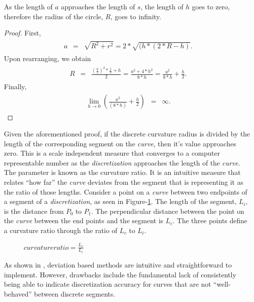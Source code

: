 \begin{theorem}
As the length of $a$ approaches the length of $s$, the length of $h$ goes 
to zero, therefore the radius of the circle, $R$, goes to infinity.  
\end{theorem}

\begin{proof}
First, 
\begin{eqnarray}
\begin{array}{lcl}
a & = & \sqrt{R^2+r^2}=2*\sqrt{(h*(2*R-h)}.
\end{array}
\end{eqnarray}
Upon rearranging, we obtain
\begin{eqnarray}
\begin{array}{lcl}
R & = & \frac{(\frac{a}{2})^2*\frac{1}{h}+h}{2}=
\frac{a^2+4*h^2}{8*h}=\frac{a^2}{8*h}+\frac{h}{2}.
\end{array}
\end{eqnarray}
Finally,
\begin{eqnarray}
\begin{array}{lcl}
\lim_{h\to0} (\frac{a^2}{(8*h)}+\frac{h}{2}) & = & \infty.
\end{array}
\end{eqnarray}
\end{proof}

Given the aforementioned proof, if the discrete curvature radius is divided by the length of the corresponding segment on the \textit{curve}, then it’s value approaches zero. This is a scale independent measure that converges to a computer representable number as the \textit{discretization} approaches the length of the \textit{curve}. The parameter is known as the curvature ratio. It is an intuitive measure that relates ``how far'' the \textit{curve} deviates from the segment that is representing it as the ratio of those lengths. Consider a point on a \textit{curve} between two endpoints of a segment of a \textit{discretization}, as seen in Figure-\ref{CurvatureRatio}. The length of the segment, $L_i$, is the distance from $P_0$ to $P_1$. The perpendicular distance between the point on the \textit{curve} between the end points and the segment is $L_c$. The three points define a curvature ratio through the ratio of $L_c$ to $L_i$.

\begin{figure}[h!]
  \caption{\label{CurvatureRatio} $curvature ratio=  \frac{L_c}{L_i}$ 
\cite{mclaurin10}}
\end{figure}

\noindent As shown in \cite{mclaurin12}, deviation based methods are intuitive and straightforward to implement. However, drawbacks include the fundamental lack of consistently being able to indicate discretization accuracy for curves that are not ``well-behaved'' between discrete segments.
